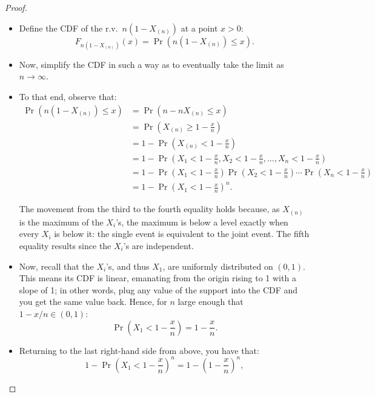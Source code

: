 \begin{proof}
\leavevmode %
\begin{itemize}

\item Define the CDF of the r.v.\ $n(1 - X_{(n)})$ at a point $x > 0$:
\[
F_{n(1 - X_{(n)})} (x) = \Pr(n(1 - X_{(n)}) \leq x).
\]

\item Now, simplify the CDF in such a way as to eventually take the limit as $n \to \infty$.

\item To that end, observe that:
\begin{align*}
\Pr(n(1 - X_{(n)}) \leq x) &= \Pr(n - nX_{(n)} \leq x ) \\
								&= \Pr \left(X_{(n)} \geq 1 - \frac{x}{n} \right) \\
								&= 1 - \Pr \left(X_{(n)} < 1 - \frac{x}{n} \right) \\
								&= 1 - \Pr \left( X_1 < 1 - \frac{x}{n}, X_2 < 1 - \frac{x}{n}, \ldots, X_n < 1 - \frac{x}{n} \right)  \\
								&= 1 - \Pr \left(X_1 < 1 - \frac{x}{n} \right)  \Pr \left( X_2 < 1 - \frac{x}{n} \right)  \cdots \Pr \left( X_n < 1 - \frac{x}{n} \right)  \\
								&= 1 - \Pr \left( X_1 < 1 - \frac{x}{n}\right)^n.
\end{align*}

The movement from the third to the fourth equality holds because, as $X_{(n)}$ is the maximum of the $X_i$'s, the maximum is below a level exactly when every $X_i$ is below it: the single event is equivalent to the joint event.
The fifth equality results since the $X_i$'s are independent.

\item Now, recall that the $X_i$'s, and thus $X_1$, are uniformly distributed on $(0,1)$.
This means its CDF is linear, emanating from the origin rising to 1 with a slope of 1;
in other words, plug any value of the support into the CDF and you get the same value back.
Hence, for $n$ large enough that $1 - x/n \in (0,1)$:
\[
\Pr \left( X_1 < 1 - \frac{x}{n}\right) = 1 - \frac{x}{n}.
\]

\item Returning to the last right-hand side from above, you have that:
\[
1 - \Pr \left( X_1 < 1 - \frac{x}{n}\right)^n = 1 -  \left( 1 - \frac{x}{n} \right)^n,
\]


\end{itemize}
\end{proof}
